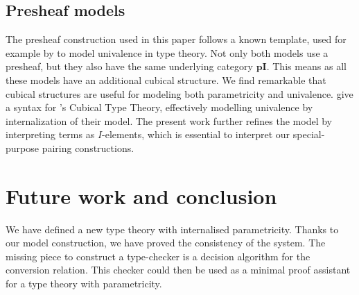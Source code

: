 \documentclass[english]{PaperTools/latex/lipics}
\def\pI{\ensuremath{\mathbf{pI}}}
\begin{document}
\subsection{Presheaf models}

The presheaf construction used in this paper follows a known template,
used for example by \citet{bezem2014model,DBLP:journals/corr/Pitts14}
to model univalence in type theory. Not only both models use a
presheaf, but they also have the same underlying category $\pI$.
This means as all these models have an additional cubical structure.
We find remarkable that cubical structures are useful for modeling both
parametricity and univalence.
\cite{altenkirch2014syntax} give a syntax for
\citeauthor{bezem2014model}'s Cubical Type Theory, effectively modelling
univalence by internalization of their model.
The present work further refines the model by interpreting terms as
$I$-elements, which is essential to interpret our special-purpose
pairing constructions.

\section{Future work and conclusion}
We have defined a new type theory with internalised parametricity.
Thanks to our model construction, we have proved the consistency of
the system. The missing piece to construct a type-checker is a
decision algorithm for the conversion relation.  This checker could
then be used as a minimal proof assistant for a type theory with
parametricity.



\end{document}
